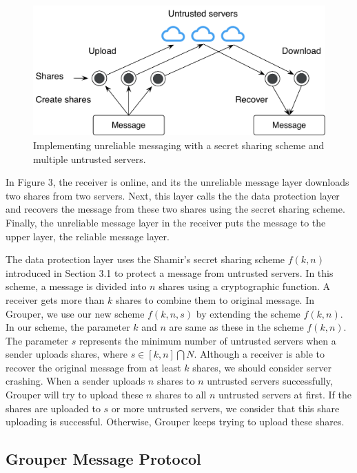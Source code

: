\documentclass[twocolumn,10pt]{article}
\begin{document}
\begin{figure}[t]
	\centering
	\includegraphics[scale=0.42]{sync_flow}
	\caption{Implementing unreliable messaging with a secret sharing scheme and multiple untrusted servers.}
\end{figure}

In Figure 3, the receiver is online, and its the unreliable message layer downloads two shares from two servers.
Next, this layer calls the the data protection layer and recovers the message from these two shares using the secret sharing scheme.
Finally, the unreliable message layer in the receiver puts the message to the upper layer, the reliable message layer.

The data protection layer uses the Shamir's secret sharing scheme $f(k, n)$ introduced in Section 3.1 to protect a message from untrusted servers.
In this scheme, a message is divided into $n$ shares using a cryptographic function.
A receiver gets more than $k$ shares to combine them to original message.
In Grouper, we use our new scheme $ f(k, n, s)$ by extending the scheme $f(k, n)$.
In our scheme, the parameter $k$ and $n$ are same as these in the scheme $f(k, n)$. 
The parameter $s$ represents the minimum number of untrusted servers when a sender uploads shares, where $s \in  [k, n] \bigcap N$.
Although a receiver is able to recover the original message from at least $k$ shares, we should consider server crashing. 
When a sender uploads $n$ shares to $n$ untrusted servers successfully, Grouper will try to upload these $n$ shares to all $n$ untrusted servers at first. 
If the shares are uploaded to $s$ or more untrusted servers, we consider that this share uploading is successful.
Otherwise, Grouper keeps trying to upload these shares.

\subsection{Grouper Message Protocol}
\end{document}
